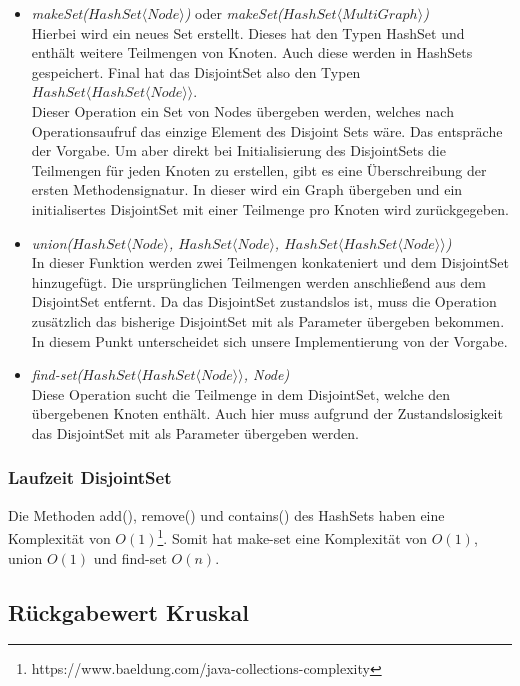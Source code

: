 \documentclass[a4paper]{article}
\begin{document}
\begin{itemize}
    \item \textit{makeSet($HashSet\langle Node\rangle$)} oder \textit{makeSet($HashSet\langle MultiGraph\rangle$)} \\Hierbei wird ein neues Set erstellt. Dieses hat den Typen HashSet und enthält weitere Teilmengen von Knoten. Auch diese werden in HashSets gespeichert. Final hat das DisjointSet also den Typen $HashSet\langle HashSet\langle Node\rangle \rangle$. \\Dieser Operation ein Set von Nodes übergeben werden, welches nach Operationsaufruf das einzige Element des Disjoint Sets wäre. Das entspräche der Vorgabe. Um aber direkt bei Initialisierung des DisjointSets die Teilmengen für jeden Knoten zu erstellen, gibt es eine Überschreibung der ersten Methodensignatur. In dieser wird ein Graph übergeben und ein initialisertes DisjointSet mit einer Teilmenge pro Knoten wird zurückgegeben. 
    \item \textit{union($HashSet\langle Node\rangle$, $HashSet\langle Node\rangle$, $HashSet\langle HashSet\langle Node\rangle \rangle$)} \\In dieser Funktion werden zwei Teilmengen konkateniert und dem DisjointSet hinzugefügt. Die ursprünglichen Teilmengen werden anschließend aus dem DisjointSet entfernt. Da das DisjointSet zustandslos ist, muss die Operation zusätzlich das bisherige DisjointSet mit als Parameter übergeben bekommen. In diesem Punkt unterscheidet sich unsere Implementierung von der Vorgabe.
    \item \textit{find-set($HashSet\langle HashSet\langle Node\rangle \rangle$, Node)} \\Diese Operation sucht die Teilmenge in dem DisjointSet, welche den übergebenen Knoten enthält. Auch hier muss aufgrund der Zustandslosigkeit das DisjointSet mit als Parameter übergeben werden.
\end{itemize}

\subsubsection{Laufzeit DisjointSet}

Die Methoden add(), remove() und contains() des HashSets haben eine Komplexität von $O(1)$\footnote{https://www.baeldung.com/java-collections-complexity}. Somit hat make-set eine Komplexität von $O(1)$, union $O(1)$ und find-set $O(n)$.

\subsection{Rückgabewert Kruskal}
\end{document}
